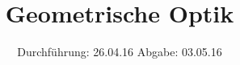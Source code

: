 

\subject{Versuch 408}
\title{Geometrische Optik}
\date{
  Durchführung: 26.04.16
  \hspace{3em}
  Abgabe: 03.05.16
}



\maketitle
\thispagestyle{empty}
\tableofcontents
\newpage







\printbibliography


